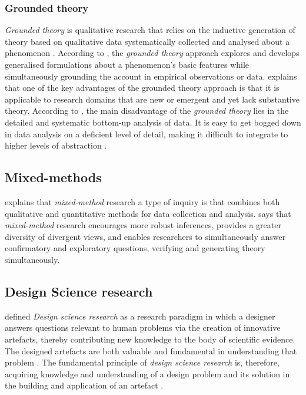 \subsubsection{Grounded theory}
\label{subsub:groundedtheory}
\textit{Grounded theory} is qualitative research that relies on the inductive generation of theory based on qualitative data systematically collected and analysed about a phenomenon \parencite[p.98--99]{Recker2013}. According to \textcite[p.~99]{Recker2013}, the \textit{grounded theory} approach explores and develops generalised formulations about a phenomenon's basic features while simultaneously grounding the account in empirical observations or data. \textcite[p.~99]{Recker2013} explains that one of the key advantages of the grounded theory approach is that it is applicable to research domains that are new or emergent and yet lack substantive theory. According to \textcite[p.~100]{Recker2013}, the main disadvantage of the \textit{grounded theory} lies in the detailed and systematic bottom-up analysis of data. It is easy to get bogged down in data analysis on a deficient level of detail, making it difficult to integrate to higher levels of abstraction \parencite[p.~100]{Recker2013}.

\subsection{Mixed-methods}
\label{sub:mixedmethods}
\textcite[p.~100--101]{Recker2013}  explains that \textit{mixed-method} research a type of inquiry is that combines both qualitative and quantitative methods for data collection and analysis. \textcite[p.~101]{Recker2013}  says that \textit{mixed-method} research encourages more robust inferences, provides a greater diversity of divergent views, and enables researchers to simultaneously answer confirmatory and exploratory questions, verifying and generating theory simultaneously.

\subsection{Design Science research}
\label{sub:designscienceresearch}
\textcite[p.~5]{Hevner2004} defined \textit{Design science research} as a research paradigm in which a designer answers questions relevant to human problems via the creation of innovative artefacts, thereby contributing new knowledge to the body of scientific evidence. The designed artefacts are both valuable and fundamental in understanding that problem \parencite[p.~5]{Hevner2004}. The fundamental principle of \textit{design science research} is, therefore, acquiring knowledge and understanding of a design problem and its solution in the building and application of an artefact \parencite[p.~103]{Recker2013}.

